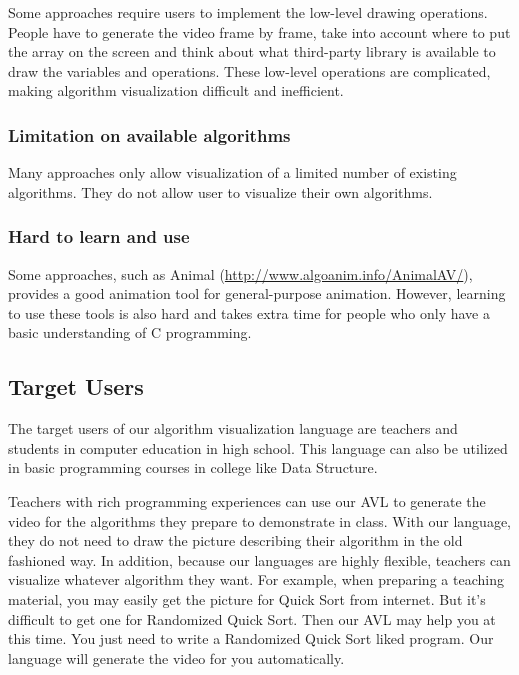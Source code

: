 Some approaches require users to implement the low-level drawing operations. People have to generate
the video frame by frame, take into account where to put the array on the screen and think about
what third-party library is available to draw the variables and operations. These low-level
operations are complicated, making algorithm visualization difficult and inefficient.
		  
\subsubsection{Limitation on available algorithms}

Many approaches only allow visualization of a limited number of existing algorithms. They do not
allow user to visualize their own algorithms.
		   
\subsubsection{Hard to learn and use}

Some approaches, such as Animal (\url{http://www.algoanim.info/AnimalAV/}), provides a good
animation tool for general-purpose animation. However, learning to use these tools is also hard and
takes extra time for people who only have a basic understanding of C programming.
		    
			 
\subsection{Target Users}
			  
The target users of our algorithm visualization language are teachers and students in computer
education in high school. This language can also be utilized in basic programming courses in college
like Data Structure.
			   
Teachers with rich programming experiences can use our AVL to generate the video for the algorithms
they prepare to demonstrate in class. With our language, they do not need to draw the picture
describing their algorithm in the old fashioned way. In addition, because our languages are highly
flexible, teachers can visualize whatever algorithm they want. For example, when preparing a
teaching material, you may easily get the picture for Quick Sort from internet. But it’s difficult
to get one for Randomized Quick Sort. Then our AVL may help you at this time. You just need to write
a Randomized Quick Sort liked program. Our language will generate the video for you automatically.
			    
